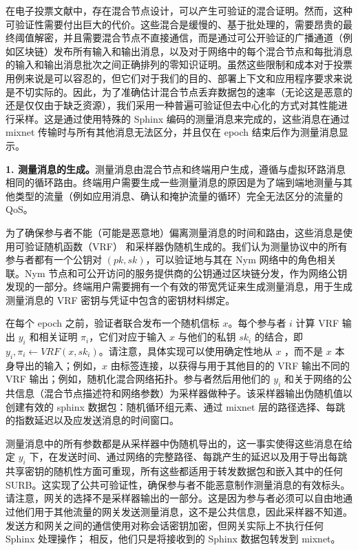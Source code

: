 \documentclass{article}
\begin{document}
	在电子投票文献中，存在混合节点设计，可以产生可验证的混合证明\cite{ref1, ref4, ref50}。然而，这种可验证性需要付出巨大的代价。这些混合是缓慢的、基于批处理的，需要昂贵的最终阈值解密，并且需要混合节点不直接通信，而是通过可公开验证的广播通道（例如区块链）发布所有输入和输出消息，以及对于网络中的每个混合节点和每批消息的输入和输出消息批次之间正确排列的零知识证明。虽然这些限制和成本对于投票用例来说是可以容忍的，但它们对于我们的目的、部署上下文和应用程序要求来说是不切实际的。因此，为了准确估计混合节点丢弃数据包的速率（无论这是恶意的还是仅仅由于缺乏资源），我们采用一种普遍可验证但去中心化的方式对其性能进行采样。这是通过使用特殊的 Sphinx 编码的测量消息来完成的，这些消息在通过 mixnet 传输时与所有其他消息无法区分，并且仅在 epoch 结束后作为测量消息显示。\newline

	\textbf{1. 测量消息的生成。}测量消息由混合节点和终端用户生成，遵循与虚拟环路消息相同的循环路由。终端用户需要生成一些测量消息的原因是为了端到端地测量与其他类型的流量（例如应用消息、确认和掩护流量的循环）完全无法区分的流量的 QoS。\newline

	为了确保参与者不能（可能是恶意地）偏离测量消息的时间和路由，这些消息是使用可验证随机函数（VRF）\cite{ref80} 和采样器伪随机生成的。我们认为测量协议中的所有参与者都有一个公钥对 $(pk, sk)$，可以验证地与其在 Nym 网络中的角色相关联。Nym 节点和可公开访问的服务提供商的公钥通过区块链分发，作为网络公钥发现的一部分。终端用户需要拥有一个有效的带宽凭证来生成测量消息，用于生成测量消息的 VRF 密钥与凭证中包含的密钥材料绑定。\newline

	在每个 epoch 之前，验证者联合发布一个随机信标 $x$。每个参与者 $i$ 计算 VRF 输出 $y_{i}$ 和相关证明 $\pi_{i}$，它们对应于输入 $x$ 与他们的私钥 $sk_{i}$ 的结合，即 $y_{i}, \pi_{i} \leftarrow V R F\left(x, s k_{i}\right)$。请注意，具体实现可以使用确定性地从 $x$ ，而不是 $x$ 本身导出的输入；例如，$x$ 由标签连接，以获得与用于其他目的的 VRF 输出不同的 VRF 输出；例如，随机化混合网络拓扑。参与者然后用他们的 $y_{i}$ 和关于网络的公共信息（混合节点描述符和网络参数）为采样器做种子。该采样器输出伪随机值以创建有效的 sphinx 数据包：随机循环组元素、通过 mixnet 层的路径选择、每跳的指数延迟以及应发送消息的时间窗口。\newline

	测量消息中的所有参数都是从采样器中伪随机导出的，这一事实使得这些消息在给定 $y_{i}$ 下，在发送时间、通过网络的完整路径、每跳产生的延迟以及用于导出每跳共享密钥的随机性方面可重现，所有这些都适用于转发数据包和嵌入其中的任何 SURB。这实现了公共可验证性，确保参与者不能恶意制作测量消息的有效标头。请注意，网关的选择不是采样器输出的一部分。这是因为参与者必须可以自由地通过他们用于其他流量的网关发送测量消息，这不是公共信息，因此采样器不知道。发送方和网关之间的通信使用对称会话密钥加密，但网关实际上不执行任何 Sphinx 处理操作； 相反，他们只是将接收到的 Sphinx 数据包转发到 mixnet。\newline
\end{document}
